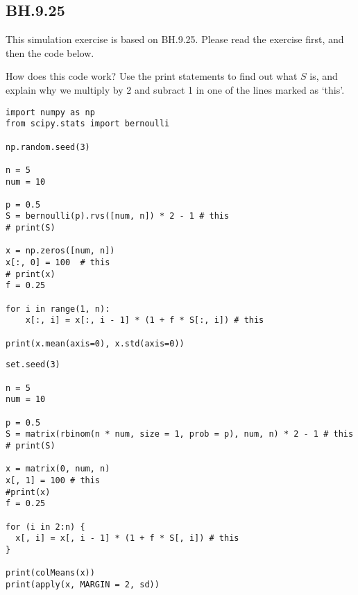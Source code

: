 

\subsection{BH.9.25}

This simulation exercise is based on BH.9.25.  Please read the exercise first, and then the code below.

\begin{exercise}
How does this code work? Use the print statements to find out what $S$ is, and explain why we multiply by 2 and subract 1 in one of the lines marked as `this'.

\begin{verbatim}
import numpy as np
from scipy.stats import bernoulli

np.random.seed(3)

n = 5
num = 10

p = 0.5
S = bernoulli(p).rvs([num, n]) * 2 - 1 # this
# print(S)

x = np.zeros([num, n])
x[:, 0] = 100  # this
# print(x)
f = 0.25

for i in range(1, n):
    x[:, i] = x[:, i - 1] * (1 + f * S[:, i]) # this

print(x.mean(axis=0), x.std(axis=0))
\end{verbatim}

\begin{verbatim}
set.seed(3)

n = 5
num = 10

p = 0.5
S = matrix(rbinom(n * num, size = 1, prob = p), num, n) * 2 - 1 # this
# print(S)

x = matrix(0, num, n)
x[, 1] = 100 # this
#print(x)
f = 0.25

for (i in 2:n) {
  x[, i] = x[, i - 1] * (1 + f * S[, i]) # this
}

print(colMeans(x))
print(apply(x, MARGIN = 2, sd))
\end{verbatim}
\end{exercise}



